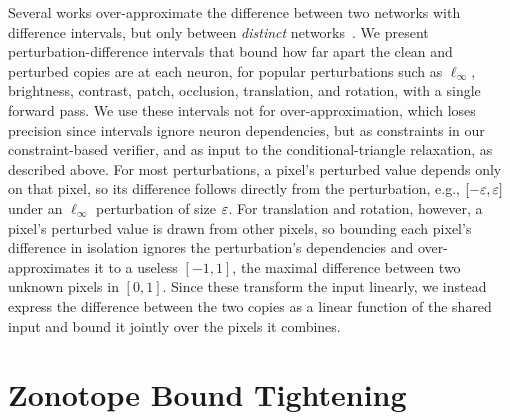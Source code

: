 Several works over-approximate the difference between two networks with difference intervals, but only
between \emph{distinct} networks~\cite{paulsen2020reludiff,paulsen2020neurodiff,kabaha2025lucid}. We
present perturbation-difference intervals that bound how far apart the clean and perturbed copies are at
each neuron, for popular perturbations such as $\ell_\infty$, brightness, contrast, patch, occlusion,
translation, and rotation, with a single forward pass. We use these intervals not for over-approximation, which loses precision since intervals ignore neuron
dependencies, but as constraints in our constraint-based verifier, and as input to the
conditional-triangle relaxation, as described above. For most perturbations, a pixel's perturbed value depends only on that pixel, so its difference follows
directly from the perturbation, e.g., $[-\varepsilon,\varepsilon]$ under an $\ell_\infty$ perturbation of size $\varepsilon$. For translation and rotation, however, a pixel's perturbed value is
drawn from other pixels, so bounding each pixel's difference in isolation ignores the perturbation's
dependencies and over-approximates it to a useless $[-1,1]$, the maximal difference between two unknown
pixels in $[0,1]$. Since these transform the input linearly, we instead express the difference between
the two copies as a linear function of the shared input and bound it jointly over the pixels it combines.


\section{Zonotope Bound Tightening}
\label{sec:key-ideas-zonotope}

